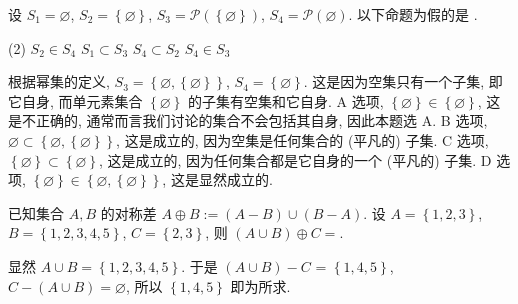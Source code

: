 \documentclass[10pt,UTF8]{book} %
\begin{document}
\begin{exercise}
    设 $S_1 = \varnothing$, $S_2 = \left\{ \varnothing \right\}$,
    $S_3 = \mathcal{P}(\left\{ \varnothing \right\})$,
    $S_4 = \mathcal{P}(\varnothing)$.
    以下命题为假的是 \underline{\qquad \qquad \qquad}.
    \begin{tasks}[label={\Alph*.}](2)
        \task $S_2 \in S_4$
        \task $S_1 \subset S_3$
        \task $S_4 \subset S_2$
        \task $S_4 \in S_3$
    \end{tasks}
    \begin{cmt}
        根据幂集的定义, $S_3 = \left\{ \varnothing, \left\{ \varnothing \right\} \right\}$,
        $S_4 = \left\{\varnothing\right\}$.
        这是因为空集只有一个子集, 即它自身, 而单元素集合 $\left\{ \varnothing \right\}$
        的子集有空集和它自身.
        \newline A 选项, $\left\{ \varnothing \right\} \in \left\{\varnothing\right\}$,
        这是不正确的, 通常而言我们讨论的集合不会包括其自身, 因此本题选 A.
        \newline B 选项, $\varnothing \subset \left\{ \varnothing, \left\{
            \varnothing
        \right\} \right\}$, 这是成立的, 因为空集是任何集合的 (平凡的) 子集.
        \newline C 选项, $\left\{ \varnothing \right\} \subset \left\{ \varnothing \right\}$,
        这是成立的, 因为任何集合都是它自身的一个 (平凡的) 子集.
        \newline D 选项, $\left\{ \varnothing \right\} \in \left\{ \varnothing, \left\{
            \varnothing
        \right\} \right\}$, 这是显然成立的.
    \end{cmt}
\end{exercise}

\begin{exercise}
    已知集合 $A, B$ 的对称差 $A \oplus B := (A - B) \cup (B - A)$.
    设 $A = \left\{ 1,2,3 \right\}$, $B = \left\{ 1,2,3,4,5 \right\}$,
    $C = \left\{2,3\right\}$, 则 $(A \cup B) \oplus C = $\underline{\qquad \qquad \qquad}.
    \begin{cmt}
        显然 $A \cup B = \left\{ 1,2,3,4,5 \right\}$.
        于是 $(A \cup B) - C$ = $\left\{ 1,4,5 \right\}$,
        $C - (A \cup B) = \varnothing$,
        所以 $\left\{ 1,4,5 \right\}$ 即为所求.
    \end{cmt}
\end{exercise}
\end{document}
